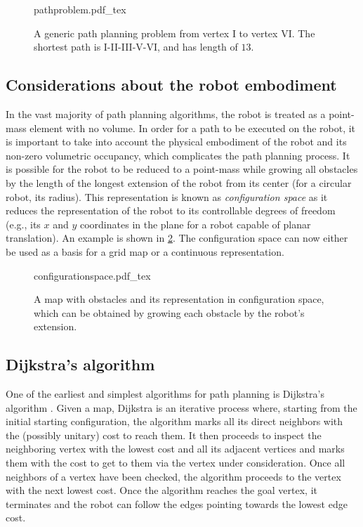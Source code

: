 \begin{figure}[!htb]
    \centering
    \def\svgwidth{0.6\textwidth}
    {pathproblem.pdf_tex}
    \caption{A generic path planning problem from vertex I to vertex VI. The shortest path is I-II-III-V-VI, and has length of $13$. \label{fig:pathproblem}}
\end{figure}

\subsection{Considerations about the robot embodiment}

In the vast majority of path planning algorithms, the robot is treated as a point-mass element with no volume. In order for a path to be executed on the robot, it is important to take into account the physical embodiment of the robot and its non-zero volumetric occupancy, which complicates the path planning process.
It is possible for the robot to be reduced to a point-mass while growing all obstacles by the length of the longest extension of the robot from its center (for a circular robot, its radius). This representation is known as \textsl{configuration space} as it reduces the representation of the robot to its controllable degrees of freedom (e.g., its $x$ and $y$ coordinates in the plane for a robot capable of planar translation). An example is shown in \cref{fig:cspace}. The configuration space can now either be used as a basis for a grid map or a continuous representation.

\begin{figure}[!htb]
    \centering
    \def\svgwidth{0.9\textwidth}
    {configurationspace.pdf_tex}
    \caption{A map with obstacles and its representation in configuration space, which can be obtained by growing each obstacle by the robot's extension. \label{fig:cspace}}
\end{figure}

\subsection{Dijkstra's algorithm}

One of the earliest and simplest algorithms for path planning is Dijkstra's algorithm \cite{dijkstra1959note}. Given a map, Dijkstra is an iterative process where, starting from the initial starting configuration, the algorithm marks all its direct neighbors with the (possibly unitary) cost to reach them. It then proceeds to inspect the neighboring vertex with the lowest cost and all its adjacent vertices and marks them with the cost to get to them via the vertex under consideration. Once all neighbors of a vertex have been checked, the algorithm proceeds to the vertex with the next lowest cost. Once the algorithm reaches the goal vertex, it terminates and the robot can follow the edges pointing towards the lowest edge cost.

